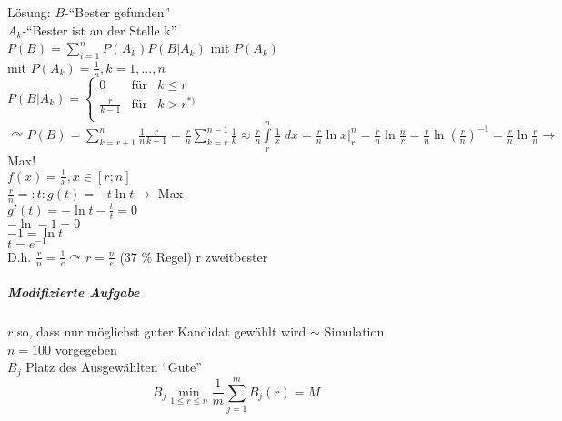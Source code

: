 \documentclass[a4paper]{scrartcl}
\begin{document}
Lösung: $B$-"`Bester gefunden"'\\
$A_k$-"`Bester ist an der Stelle k"'\\
$P(B) = \sum\limits_{i=1}^{n} P(A_k) P(B|A_k)$ mit $P(A_k)$\\
mit $P(A_k) = \frac{1}{n}, k=1,\dots,n$\\
$P(B|A_k) = \left\{ \begin{array}{ccc} 0 & \text{für} & k \leq r\\ \frac{r}{k-1} & \text{für} & k > r^{*)} \\ \end{array} \right.$\\
$\curvearrowright P(B) = \sum\limits_{k=r+1}^n \frac{1}{n} \frac{r}{k-1} = \frac{r}{n} \sum\limits_{k=r}^{n-1} \frac{1}{k} \approx \frac{r}{n} \int\limits_r^n \frac{1}{x} \; dx = \frac{r}{n} \ln x |_r^n = \frac{r}{n} \ln \frac{n}{r} = \frac{r}{n} \ln (\frac{r}{n})^{-1} = \frac{r}{n} \ln \frac{r}{n} \rightarrow$ Max!\\
$f(x) = \frac{1}{x} , x \in [r;n]$\\
$\frac{r}{n} =: t : g(t) = -t \ln t \rightarrow$ Max\\
$g'(t) = - \ln t  - \frac{t}{t} = 0$\\
$-\ln -1 = 0$\\
$-1 = \ln t$\\
$t = e^{-1}$\\
D.h. $\frac{r}{n} = \frac{1}{e} \curvearrowright r = \frac{n}{e}$ (37 \% Regel) r zweitbester

\subparagraph{Modifizierte Aufgabe} $r$ so, dass nur möglichst guter Kandidat gewählt wird $\sim$ Simulation\\
$n=100$ vorgegeben\\
$B_j$ Platz des Ausgewählten "`Gute"'
\[ B_j \min\limits_{1 \leq r \leq n} \frac{1}{m} \sum\limits_{j=1}^m B_j (r) = M\]
\end{document}
